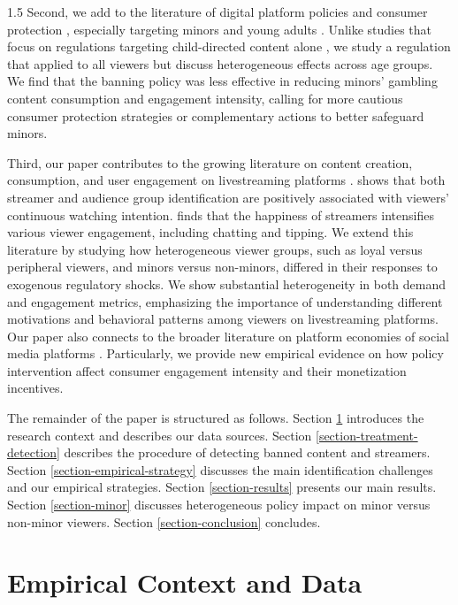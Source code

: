 \documentclass[a4paper,12pt]{article}
\begin{document}
\begin{spacing}{1.5}
Second, we add to the literature of digital platform policies and consumer protection \citep{blaseg2020consumer,hunold2020rankings}, especially targeting minors and young adults \citep{braghieri2022social}. Unlike studies that focus on regulations targeting child-directed content alone \citep{johnson2024coppacalypse,cecere2025privacy}, we study a regulation that applied to all viewers but discuss heterogeneous effects across age groups. We find that the banning policy was less effective in reducing minors' gambling content consumption and engagement intensity, calling for more cautious consumer protection strategies or complementary actions to better safeguard minors.

Third, our paper contributes to the growing literature on content creation, consumption, and user engagement on livestreaming platforms \citep{zhao2023direct, qian2025express, huang2025promotional}. 
\cite{hu2017audiences} shows that both streamer and audience group identification are positively associated with viewers' continuous watching intention. \cite{lin2021happiness} finds that the happiness of streamers intensifies various viewer engagement, including chatting and tipping. We extend this literature by studying how heterogeneous viewer groups, such as loyal versus peripheral viewers, and minors versus non-minors, differed in their responses to exogenous regulatory shocks. We show substantial heterogeneity in both demand and engagement metrics, emphasizing the importance of understanding different motivations and behavioral patterns among viewers on livestreaming platforms. Our paper also connects to the broader literature on platform economies of social media platforms \citep{allcott2020welfare,aridor2024economics}. Particularly, we provide new empirical evidence on how policy intervention affect consumer engagement intensity and their monetization incentives. 

The remainder of the paper is structured as follows. Section \ref{section-empirical-setting} introduces the research context and describes our data sources. Section \ref{section-treatment-detection} describes the procedure of detecting banned content and streamers. Section \ref{section-empirical-strategy} discusses the main identification challenges and our empirical strategies. Section \ref{section-results} presents our main results. Section \ref{section-minor} discusses heterogeneous policy impact on minor versus non-minor viewers. Section \ref{section-conclusion} concludes.


\section{Empirical Context and Data}\label{section-empirical-setting}

\end{spacing}
\end{document}
